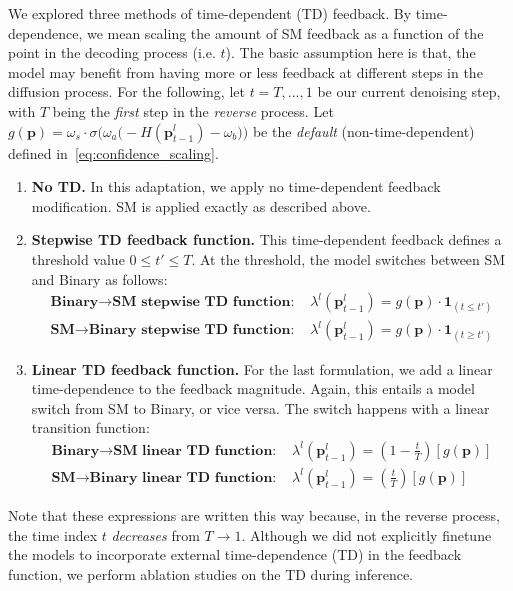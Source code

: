 \documentclass{article}
\begin{document}
We explored three methods of time-dependent (TD) feedback. By time-dependence, we mean scaling the amount of SM feedback as a function of the point in the decoding process (i.e. $t$).
%
The basic assumption here is that, the model may benefit from having more or less feedback at different steps in the diffusion process.
%
For the following, let $t = T,...,1$ be our current denoising step, with $T$ being the \textit{first} step in the \textit{reverse} process. 
%
Let $g(\mathbf{p}) = \omega_s\cdot \sigma \Big(\omega_a\big(-H(\mathbf{p}^l_{t-1})-\omega_b\big)\Big)$ be the \emph{default} (non-time-dependent) defined in~\eqref{eq:confidence_scaling}.
%
\begin{enumerate}
    \item \textbf{No TD.} In this adaptation, we apply no time-dependent feedback modification. SM is applied exactly as described above. 
    \item \textbf{Stepwise TD feedback function.} This time-dependent feedback defines a threshold value $0 \leq  t' \leq T$. At the threshold, the model switches between SM and Binary as follows:
    \begin{align*}
        \textbf{Binary$\rightarrow$SM stepwise TD function: }& \lambda^l (\mathbf{p}^l_{t-1}) = g(\mathbf{p})\cdot \mathbf{1}_{(t \leq t')}\\
        \textbf{SM$\rightarrow$Binary stepwise TD function: }& \lambda^l (\mathbf{p}^l_{t-1}) = g(\mathbf{p})\cdot \mathbf{1}_{(t \geq t')}
    \end{align*}
    \item \textbf{Linear TD feedback function.} For the last formulation, we add a linear time-dependence to the feedback magnitude. Again, this entails a model switch from SM to Binary, or vice versa. The switch happens with a linear transition function:
    \begin{align*}
        \textbf{Binary$\rightarrow$SM linear TD function: }& \lambda^l (\mathbf{p}^l_{t-1}) = \left(1-\frac{t}{T}\right)\left[g(\mathbf{p})\right]\\
        \textbf{SM$\rightarrow$Binary linear TD function: }& \lambda^l (\mathbf{p}^l_{t-1}) = \left(\frac{t}{T}\right)\left[g(\mathbf{p})\right]
    \end{align*}
\end{enumerate}
Note that these expressions are written this way because, in the reverse process, the time index $t$ \textit{decreases} from $T \rightarrow 1$. 
%
Although we did not explicitly finetune the models to incorporate external time-dependence (TD) in the feedback function, we perform ablation studies on the TD during inference.
%
\end{document}
